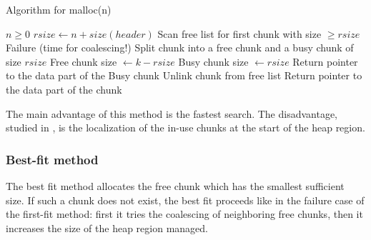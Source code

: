 \begin{algorithm}
\caption{Algorithm for malloc(n)}
\begin{small} 
\begin{algorithmic} 
\REQUIRE $n \geq 0$
\STATE $rsize \leftarrow n + size(header)$  
\STATE Scan free list for first chunk with size $\geq rsize$ 
  \STATE Failure (time for coalescing!) 
   \STATE Split chunk into a free chunk and a busy chunk of size $rsize$
   \STATE Free chunk size $\leftarrow k - rsize$
   \STATE Busy chunk size $\leftarrow rsize$
    \STATE Return pointer to the data part of the Busy chunk 
\ELSE 
    \STATE Unlink chunk from free list 
    \STATE Return pointer to the data part of the chunk 
\ENDIF
\end{algorithmic}
\end{small} 
\end{algorithm}

The main advantage of this method is the fastest search.
The disadvantage, studied in \cite{Knuth73a}, is the localization of the in-use chunks at the start of the heap region.

\subsubsection{Best-fit method}
The best fit method allocates the free chunk which has the smallest sufficient size.
If such a chunk does not exist, the best fit proceeds like in the failure case of the first-fit method: 
first it tries the coalescing of neighboring free chunks, then it increases the size of the heap region managed.

